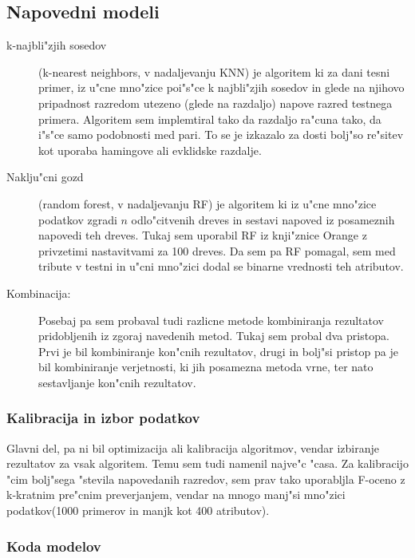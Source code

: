 \documentclass[a4paper,11pt]{article}
\begin{document}
\subsection{Napovedni modeli}

\begin{description}
\item[k-najbli"zjih sosedov] (k-nearest neighbors, v nadaljevanju KNN) je algoritem ki za dani tesni primer, iz u"cne mno"zice poi"s"ce k najbli"zjih sosedov in glede na njihovo pripadnost razredom utezeno (glede na razdaljo) napove razred testnega primera. Algoritem sem implemtiral tako da razdaljo ra"cuna tako, da i"s"ce samo podobnosti med pari. To se je izkazalo za dosti bolj"so re"sitev kot uporaba hamingove ali evklidske razdalje. 

\item[Naklju"cni gozd] (random forest, v nadaljevanju RF) je algoritem ki iz u"cne mno"zice podatkov zgradi $n$ odlo"citvenih dreves in sestavi napoved iz posameznih napovedi teh dreves. Tukaj sem uporabil RF iz knji"znice Orange z privzetimi nastavitvami za 100 dreves. Da sem pa RF pomagal, sem med tribute v testni in u"cni mno"zici dodal se binarne vrednosti teh atributov.

\item[Kombinacija: ] Posebaj pa sem probaval tudi razlicne metode kombiniranja rezultatov pridobljenih iz zgoraj navedenih metod. Tukaj sem probal dva pristopa. Prvi je bil kombiniranje kon"cnih rezultatov, drugi in bolj"si pristop pa je bil kombiniranje verjetnosti, ki jih posamezna metoda vrne, ter nato sestavljanje kon"cnih rezultatov. \\

\end{description}

\subsubsection*{Kalibracija in izbor podatkov}
Glavni del, pa ni bil optimizacija ali kalibracija algoritmov, vendar izbiranje rezultatov za vsak algoritem. Temu sem tudi namenil najve"c "casa. Za kalibracijo "cim bolj"sega "stevila napovedanih razredov, sem prav tako uporabljla F-oceno z k-kratnim pre"cnim preverjanjem, vendar na mnogo manj"si mno"zici podatkov(1000 primerov in manjk kot 400 atributov). \\

\subsubsection*{Koda modelov}
\end{document}
